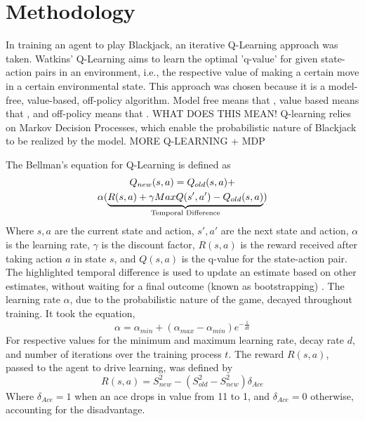 \section{Methodology}

In training an agent to play Blackjack, an iterative Q-Learning approach was taken. Watkins' Q-Learning aims to learn the optimal 'q-value' for given state-action pairs in an environment, i.e., the respective value of making a certain move in a certain environmental state. This approach was chosen because it is a model-free, value-based, off-policy algorithm. Model free means that , value based means that  , and off-policy means that   .
WHAT DOES THIS MEAN!  
Q-learning relies on Markov Decision Processes, which enable the probabilistic nature of Blackjack to be realized by the model. MORE Q-LEARNING + MDP

The Bellman's equation for Q-Learning is defined as
\begin{multline} \label{eq:Bellman}
    Q_{new}(s,a)=Q_{old}(s,a)+\\\alpha(\underbrace{R(s,a)+\gamma MaxQ(s',a')-Q_{old}(s,a)}_{\mathclap{\text{Temporal Difference}}})
\end{multline}
Where \( s, a \) are the current state and action,  \( s', a' \) are the next state and action, \( \alpha \) is the learning rate, \( \gamma \) is the discount factor, \( R(s,a) \) is the reward received after taking action \( a \) in state \( s \), and \( Q(s,a) \) is the q-value for the state-action pair. The highlighted temporal difference is 
used to update an estimate based on other estimates, without waiting for a final outcome (known as bootstrapping) \cite{10.5555/3312046}. The learning rate \(\alpha\), due to the probabilistic nature of the game, decayed throughout training. It took the equation, 
\begin{equation} \label{eq:learning rate}
    \alpha = \alpha_{min} + (\alpha_{max} - \alpha_{min})e^{-\frac{1}{dt}}
\end{equation}
For respective values for the minimum and maximum learning rate, decay rate \(d\), and number of iterations over the training process \(t\). The reward \(R(s,a)\), passed to the agent to drive learning, was defined by
\begin{equation} \label{reward}
    R(s,a) = S_{new}^2 - (S_{old}^2 - S_{new}^2)\delta_{Ace}
\end{equation}
Where \(\delta_{Ace}=1\) when an ace drops in value from 11 to 1, and \(\delta_{Ace}=0\) otherwise, accounting for the disadvantage.

